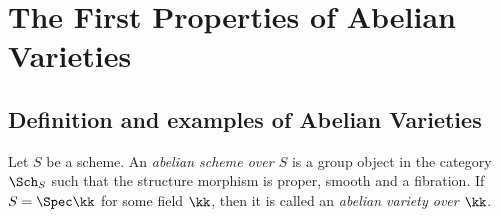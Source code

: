 \section{The First Properties of Abelian Varieties}

\subsection{Definition and examples of Abelian Varieties}

    \begin{definition}\label{def: abelian schemes}
        Let \(S\) be a scheme.
        An \emph{abelian scheme over \(S\)} is a group object in the category \(\Sch_S\) such that the structure morphism is proper, smooth and a fibration.
        If \(S = \Spec \kk\) for some field \(\kk\), then it is called an \emph{abelian variety over \(\kk\)}.
    \end{definition}

